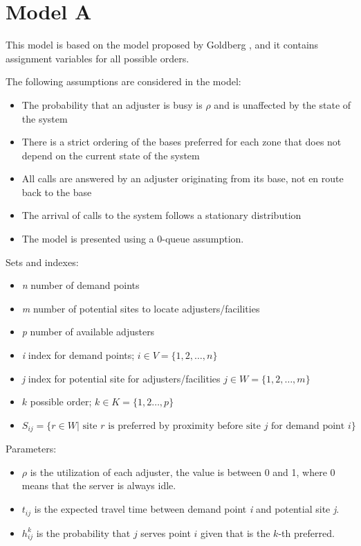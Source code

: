 
\section{Model A}

This model is based
on the model
proposed by Goldberg \cite{goldberg1990validating},
and it contains assignment variables
for all possible orders.

The following assumptions are considered in the model:
\begin{itemize}
\item The probability that an adjuster is busy
  is $\rho$ and is unaffected by the state of the system
\item There is a strict ordering of the bases preferred for each zone
  that does not depend
  on the current state of the system
\item All calls are answered
  by an adjuster originating from its base,
  not en route back to the base
\item The arrival of calls to the system
  follows a stationary distribution
\item The model is presented
  using a 0-queue assumption.
\end{itemize}

Sets and indexes:
\begin{itemize}
\item \textit{n} number of demand points
\item \textit{m} number of potential sites to locate adjusters/facilities
\item \textit{p} number of available adjusters
\item \textit{i} index for demand points;
  $i \in V = \{1,2,\ldots,n\}$ 
\item \textit{j} index for potential site for adjusters/facilities
  $j \in W = \{1,2,\ldots,m\}$
\item $k$ possible order;
  $k \in K = \{1,2\ldots,p\}$
\item $S_{ij} = \{
  r \in W | \mbox{ site } r \mbox{ is preferred by proximity before site } j
  \mbox{ for demand point } i
  \}$
\end{itemize}

Parameters:
\begin{itemize}
\item $\rho$ is the utilization of each adjuster,
  the value is between 0 and 1, 
  where 0 means that the server is always idle.
\item $t_{ij}$ is the expected travel time
  between demand point \textit{i}
  and potential site \textit{j}.
\item $h_{ij}^{k}$ is the probability
  that $j$ serves point $i$
  given that
  is the $k$-th preferred.
\end{itemize}

